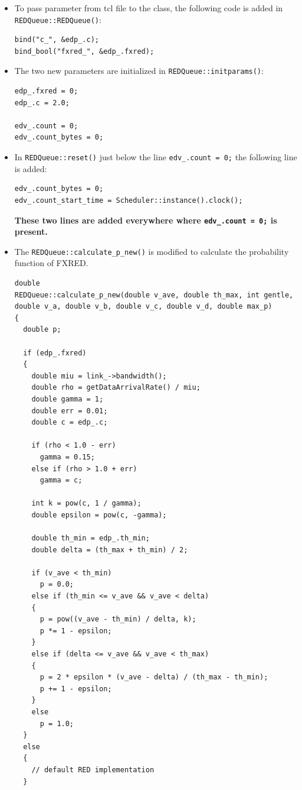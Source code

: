 \documentclass[10pt]{report}
\begin{document}
\begin{itemize}
  \item To pass parameter from tcl file to the class, the following code is added in \texttt{REDQueue::REDQueue()}:
\begin{verbatim}
bind("c_", &edp_.c);
bind_bool("fxred_", &edp_.fxred);
\end{verbatim}


  \item The two new parameters are initialized in \texttt{REDQueue::initparams()}:
\begin{verbatim}
edp_.fxred = 0;
edp_.c = 2.0;

edv_.count = 0;
edv_.count_bytes = 0;
\end{verbatim}


  \item In \texttt{REDQueue::reset()} just below the line \texttt{edv\_.count = 0;} the following line is added:
\begin{verbatim}
edv_.count_bytes = 0;
edv_.count_start_time = Scheduler::instance().clock();
\end{verbatim}

\textbf{These two lines are added everywhere where \texttt{edv\_.count = 0;} is present.}

  \item The \texttt{REDQueue::calculate\_p\_new()} is modified to calculate the probability function of FXRED.
\begin{verbatim}
double
REDQueue::calculate_p_new(double v_ave, double th_max, int gentle, 
double v_a, double v_b, double v_c, double v_d, double max_p)
{
  double p;

  if (edp_.fxred)
  {
    double miu = link_->bandwidth();
    double rho = getDataArrivalRate() / miu;
    double gamma = 1;
    double err = 0.01;
    double c = edp_.c;

    if (rho < 1.0 - err)
      gamma = 0.15;
    else if (rho > 1.0 + err)
      gamma = c;

    int k = pow(c, 1 / gamma);
    double epsilon = pow(c, -gamma);

    double th_min = edp_.th_min;
    double delta = (th_max + th_min) / 2;

    if (v_ave < th_min)
      p = 0.0;
    else if (th_min <= v_ave && v_ave < delta)
    {
      p = pow((v_ave - th_min) / delta, k);
      p *= 1 - epsilon;
    }
    else if (delta <= v_ave && v_ave < th_max)
    {
      p = 2 * epsilon * (v_ave - delta) / (th_max - th_min);
      p += 1 - epsilon;
    }
    else
      p = 1.0;
  }
  else
  {
    // default RED implementation
  }


\end{verbatim}
\end{itemize}
\end{document}
